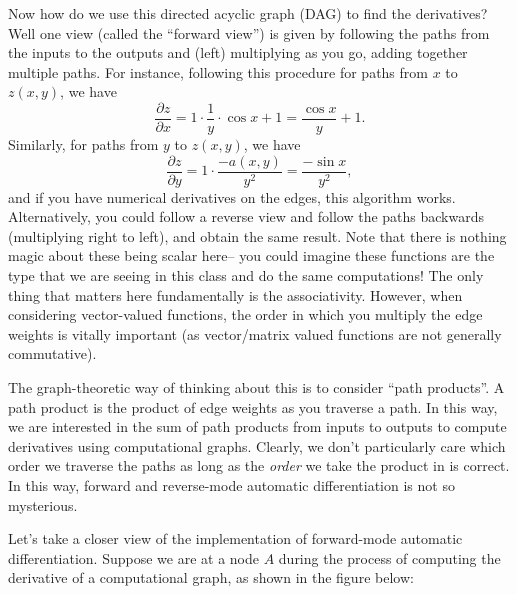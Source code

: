 Now how do we use this directed acyclic graph (DAG) to find the derivatives? Well one view (called the ``forward view'') is given by following the paths from the inputs to the outputs and (left) multiplying as you go, adding together multiple paths. For instance, following this procedure for paths from $x$ to $z(x,y)$, we have
\[
\frac{\partial z}{\partial x} = 1 \cdot \frac{1}{y} \cdot \cos x + 1 = \frac{\cos x}{y} + 1.
\]
Similarly, for paths from $y$ to $z(x,y)$, we have 
\[
\frac{\partial z}{\partial y} = 1 \cdot \frac{-a(x,y)}{ y^2} = \frac{- \sin x}{y^2},
\]
and if you have numerical derivatives on the edges, this algorithm works. Alternatively, you could follow a reverse view and follow the paths backwards (multiplying right to left), and obtain the same result.
Note that there is nothing magic about these being scalar here-- you could imagine these functions are the type that we are seeing in this class and do the same computations! The only thing that matters here fundamentally is the associativity. However,  when considering vector-valued functions, the order in which you multiply the edge weights is vitally important (as vector/matrix valued functions are not generally commutative).

The graph-theoretic way of thinking about this is to consider ``path products''. A path product is the product of edge weights as you traverse a path. In this way, we are interested in the sum of path products from inputs to outputs to compute derivatives using computational graphs. Clearly, we don't particularly care which order we traverse the paths as long as the \textit{order} we take the product in is correct. In this way, forward and reverse-mode automatic differentiation is not so mysterious.

Let's take a closer view of the implementation of forward-mode automatic differentiation. Suppose we are at a node $A$ during the process of computing the derivative of a computational graph,  as shown in the figure below: 


\begin{figure}[ht]
\begin{center}
\end{center}
\end{figure}

